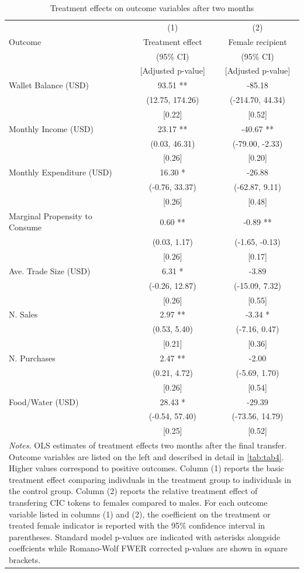 \documentclass[12pt]{article}
\begin{document}
\begin{table}[h!]
    \centering
    \caption{Treatment effects on outcome variables after two months}
    \label{tab:tab5}
    \begin{tabular}{lcc} \hline
     & (1) & (2) \\
    Outcome & Treatment effect & Female recipient \\
	 & (95\% CI) & (95\% CI) \\
	 & [Adjusted p-value] & [Adjusted p-value] \\ \hline
	 Wallet Balance (USD) & 93.51 ** & -85.18 \\
	 & (12.75, 174.26) & (-214.70, 44.34) \\
	 & [0.22] & [0.52] \\
    Monthly Income (USD) & 23.17 ** & -40.67 ** \\
     & (0.03, 46.31) & (-79.00, -2.33) \\
     & [0.26] & [0.20] \\
    Monthly Expenditure (USD) & 16.30 * & -26.88 \\
     & (-0.76, 33.37) & (-62.87, 9.11) \\
     & [0.26] & [0.48] \\
    Marginal Propensity to Consume & 0.60 ** & -0.89 ** \\
     & (0.03, 1.17) & (-1.65, -0.13) \\
     & [0.26] & [0.17] \\
    Ave. Trade Size (USD) & 6.31 * & -3.89 \\
     & (-0.26, 12.87) & (-15.09, 7.32) \\
     & [0.26] & [0.55] \\
    N. Sales & 2.97 ** & -3.34 * \\
     & (0.53, 5.40) & (-7.16, 0.47) \\
     & [0.21] & [0.36] \\
    N. Purchases & 2.47 ** & -2.00 \\
     & (0.21, 4.72) & (-5.69, 1.70) \\
     & [0.26] & [0.54] \\
    Food/Water (USD) & 28.43 * & -29.39 \\
     & (-0.54, 57.40) & (-73.56, 14.79)\\
     & [0.25] & [0.52] \\ \hline
    \multicolumn{3}{p{6in}}{\textit{Notes.} OLS estimates of treatment effects two months after the final transfer. Outcome variables are listed on the left and described in detail in \autoref{tab:tab4}. Higher values correspond to positive outcomes. Column (1) reports the basic treatment effect comparing indivduals in the treatment group to individuals in the control group. Column (2) reports the relative treatment effect of transfering CIC tokens to females compared to males. For each outcome variable listed in columns (1) and (2), the coefficient on the treatment or treated female indicator is reported with the 95\% confidence interval in parentheses. Standard model p-values are indicated with asterisks alongside coeffcients while Romano-Wolf FWER corrected p-values are shown in square brackets.} \\

\end{tabular}
\end{table}
\end{document}
